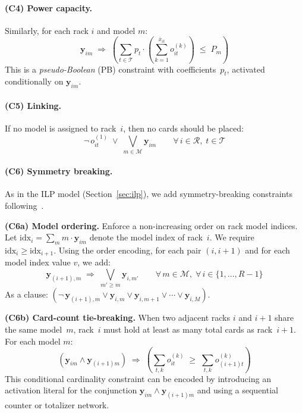 \documentclass[11pt,a4paper]{article}
\newcommand{\setR}{\mathcal{R}}
\newcommand{\setM}{\mathcal{M}}
\newcommand{\setT}{\mathcal{T}}
\begin{document}
\paragraph{(C4) Power capacity.}
Similarly, for each rack $i$ and model $m$:
\begin{equation}\label{eq:sat-power-m}
  \mathbf{y}_{im}
  \;\Rightarrow\;
  \left(
    \sum_{t \in \setT} p_t \cdot
    \left(\sum_{k=1}^{\overline{x}_{it}} o_{it}^{(k)}\right)
    \;\le\; P_m
  \right)
\end{equation}
This is a \emph{pseudo-Boolean} (PB) constraint with
coefficients~$p_t$, activated conditionally on $\mathbf{y}_{im}$.

\paragraph{(C5) Linking.}
If no model is assigned to rack~$i$, then no cards should be placed:
\begin{equation}
  \neg\, o_{it}^{(1)}
  \;\lor\;
  \bigvee_{m \in \setM} \mathbf{y}_{im}
  \qquad \forall\, i \in \setR,\; t \in \setT
\end{equation}

\paragraph{(C6) Symmetry breaking.}
As in the ILP model (Section~\ref{sec:ilp}), we add
symmetry-breaking constraints following~\cite{Kiziltan01symmetrybreaking}.

\medskip\noindent
\textbf{(C6a) Model ordering.}
Enforce a non-increasing order on rack model indices.
Let $\text{idx}_i = \sum_{m} m \cdot \mathbf{y}_{im}$
denote the model index of rack~$i$.
We require $\text{idx}_i \ge \text{idx}_{i+1}$.
Using the order encoding, for each pair $(i, i{+}1)$ and
for each model index value $v$, we add:
\begin{equation}
  \mathbf{y}_{(i+1),m}
  \;\Rightarrow\;
  \bigvee_{m' \ge m} \mathbf{y}_{i,m'}
  \qquad \forall\, m \in \setM,\;
  \forall\, i \in \{1,\dots,R{-}1\}
\end{equation}
As a clause: $(\neg\, \mathbf{y}_{(i+1),m} \lor
  \mathbf{y}_{i,m} \lor \mathbf{y}_{i,m+1} \lor \cdots
  \lor \mathbf{y}_{i,M})$.

\medskip\noindent
\textbf{(C6b) Card-count tie-breaking.}
When two adjacent racks $i$ and $i{+}1$ share the same model~$m$,
rack~$i$ must hold at least as many total cards as rack~$i{+}1$.
For each model $m$:
\begin{equation}
  (\mathbf{y}_{im} \land \mathbf{y}_{(i+1)m})
  \;\Rightarrow\;
  \left(
    \sum_{t,k} o_{it}^{(k)}
    \;\ge\;
    \sum_{t,k} o_{(i+1)t}^{(k)}
  \right)
\end{equation}
This conditional cardinality constraint can be encoded by
introducing an activation literal for the conjunction
$\mathbf{y}_{im} \land \mathbf{y}_{(i+1)m}$ and
using a sequential counter or totalizer network.
\end{document}
